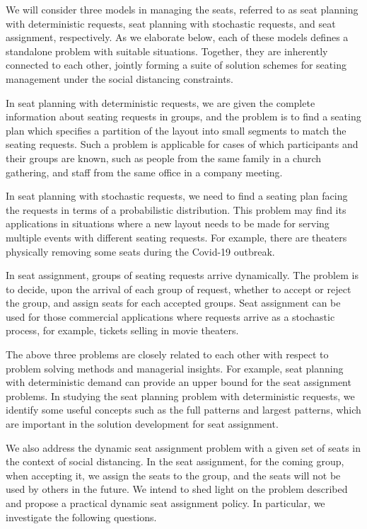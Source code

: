 We will consider three models in managing the seats, referred to as seat planning with deterministic requests, seat planning with stochastic requests, and seat assignment, respectively. As we elaborate below, each of these models defines a standalone problem with suitable situations. Together, they are inherently connected to each other, jointly forming a suite of solution schemes for seating management under the social distancing constraints.

In seat planning with deterministic requests, we are given the complete information about seating requests in groups, and the problem is to find a seating plan which specifies a partition of the layout into small segments to match the seating requests. Such a problem is applicable for cases of which participants and their groups are known, such as people from the same family in a church gathering, and staff from the same office in a company meeting.
 
In seat planning with stochastic requests, we need to find a seating plan facing the requests in terms of a probabilistic distribution. This problem may find its applications in situations where a new layout needs to be made for serving multiple events with different seating requests. For example, there are theaters physically removing some seats during the Covid-19 outbreak. \cite{Berlin_theater}

In seat assignment, groups of seating requests arrive dynamically. The problem is to decide, upon the arrival of each group of request, whether to accept or reject the group, and assign seats for each accepted groups. Seat assignment can be used for those  commercial applications where requests arrive as a stochastic process, for example, tickets selling in movie theaters.

The above three problems are closely related to each other with respect to problem solving methods and managerial insights. For example, seat planning with deterministic demand can provide an upper bound for the seat assignment problems. In studying the seat planning problem with deterministic requests, we identify some useful concepts such as the full patterns and largest patterns, which are important in the solution development for seat assignment.


We also address the dynamic seat assignment problem with a given set of seats in the context of social distancing. In the seat assignment, for the coming group, when accepting it, we assign the seats to the group, and the seats will not be used by others in the future. We intend to shed light on the problem described and propose a practical dynamic seat assignment policy. In particular, we investigate the following questions.

